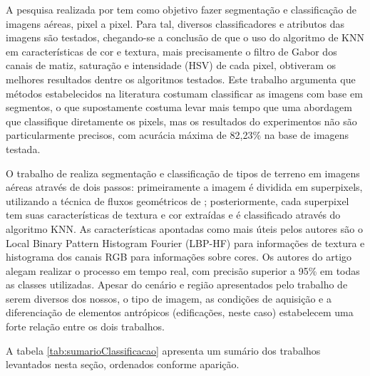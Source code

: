 A pesquisa realizada por  tem como objetivo fazer segmentação e classificação de imagens aéreas, pixel a pixel. Para tal, diversos classificadores e atributos das imagens são testados, chegando-se a conclusão de que o uso do algoritmo de KNN em características de cor e textura, mais precisamente o filtro de Gabor \cite{fogel:1989} dos canais de matiz, saturação e intensidade (HSV) de cada pixel, obtiveram os melhores resultados dentre os algoritmos testados. Este trabalho argumenta que métodos estabelecidos na literatura costumam classificar as imagens com base em segmentos, o que supostamente costuma levar mais tempo que uma abordagem que classifique diretamente os pixels, mas os resultados do experimentos não são particularmente precisos, com acurácia máxima de 82,23\% na base de imagens testada.

O trabalho de  realiza segmentação e classificação de tipos de terreno em imagens aéreas através de dois passos: primeiramente a imagem é dividida em superpixels, utilizando a técnica de fluxos geométricos de ; posteriormente, cada superpixel tem suas características de textura e cor extraídas e é classificado através do algoritmo KNN. As características apontadas como mais úteis pelos autores são o Local Binary Pattern Histogram Fourier (LBP-HF) \cite{ahonen:2009} para informações de textura e histograma dos canais RGB para informações sobre cores. Os autores do artigo alegam realizar o processo em tempo real, com precisão superior a 95\% em todas as classes utilizadas. Apesar do cenário e região apresentados pelo trabalho de  serem diversos dos nossos, o tipo de imagem, as condições de aquisição e a diferenciação de elementos antrópicos (edificações, neste caso) estabelecem uma forte relação entre os dois trabalhos.

A tabela \ref{tab:sumarioClassificacao} apresenta um sumário dos trabalhos levantados nesta seção, ordenados conforme aparição.


